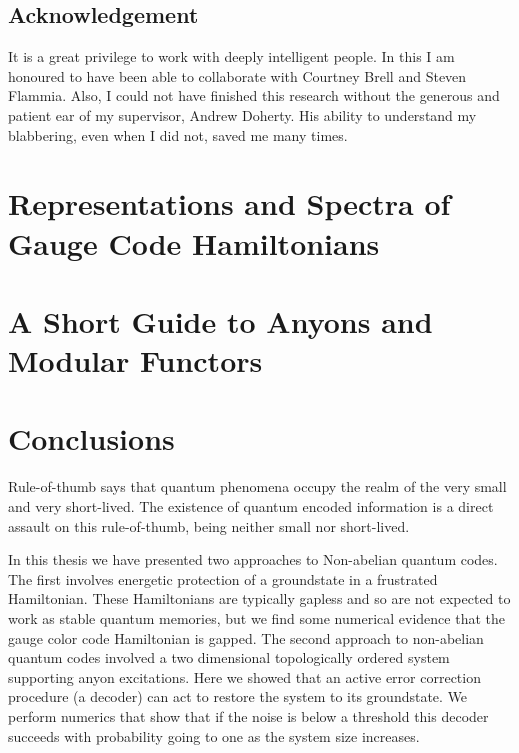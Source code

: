 \documentclass[11pt,oneside]{report}
\newcommand{\danbrowne}[1]{\ \textcolor{red}{\{#1\}}\ }
\begin{document}
\section{Acknowledgement}

It is a great privilege to work with deeply intelligent people.
In this I am honoured to have been able to collaborate with Courtney
Brell and Steven Flammia. Also, I could not have finished this
research without the generous and patient ear of my supervisor, Andrew Doherty.
His ability to understand my blabbering, even when I did not, saved me many times.


\chapter{Representations and Spectra of Gauge Code Hamiltonians}




\chapter{A Short Guide to Anyons and Modular Functors}






\chapter{Conclusions}


Rule-of-thumb says that quantum phenomena occupy 
the realm of the very small and very short-lived.
The existence of 
quantum encoded information is a direct assault on this rule-of-thumb,
being neither small nor short-lived.

In this thesis we have presented two approaches to
Non-abelian quantum codes.
The first involves energetic protection of a groundstate
in a frustrated Hamiltonian.
These Hamiltonians are typically gapless and so are not
expected to work as stable quantum memories, but we find
some numerical evidence that the gauge color code Hamiltonian
is gapped.
The second approach to non-abelian quantum codes involved
a two dimensional topologically ordered system supporting
anyon excitations.
Here we showed that an active error correction
procedure (a decoder) can act to restore the
system to its groundstate.
We perform numerics that show that if the noise is below
a threshold this decoder succeeds with probability going to
one as the system size increases.
\end{document}
